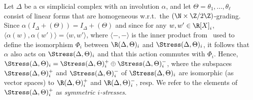 Let $\Delta$ be a cs simplicial complex with an involution $\alpha$, and let $\Theta=\theta_1,\ldots,\theta_\ell$ consist of linear forms that are homogeneous w.r.t.~the $(\N\times \Z/2\Z)$-grading. Since $\alpha(I_\Delta+(\Theta))=I_\Delta+(\Theta)$ and since for any $w,w'\in \R[X]_i$, $\langle\alpha(w),\alpha(w')\rangle=\langle w,w'\rangle$, where $\langle-,-\rangle$ is the inner product from~\cite[Section 3]{Lee96} used to define the isomorphism $\Phi_i$ between $\R(\Delta, \Theta)_i$ and $\Stress(\Delta, \Theta)_i$, it follows that $\alpha$ also acts on $\Stress(\Delta, \Theta)_i$ and that this action commutes with $\Phi_i$. Hence, $\Stress(\Delta, \Theta)_i=\Stress(\Delta, \Theta)_i^+ \oplus \Stress(\Delta, \Theta)_i^-$, where the subspaces $\Stress(\Delta, \Theta)^+_i$ and $\Stress(\Delta, \Theta)^-_i$ of $\Stress(\Delta,\Theta)_i$ are isomorphic (as vector spaces) to $\R(\Delta, \Theta)^+_i$ and $\R(\Delta, \Theta)^-_i$, resp. We refer to the elements of $\Stress(\Delta, \Theta)^+_i$ as \emph{symmetric $i$-stresses}. 

